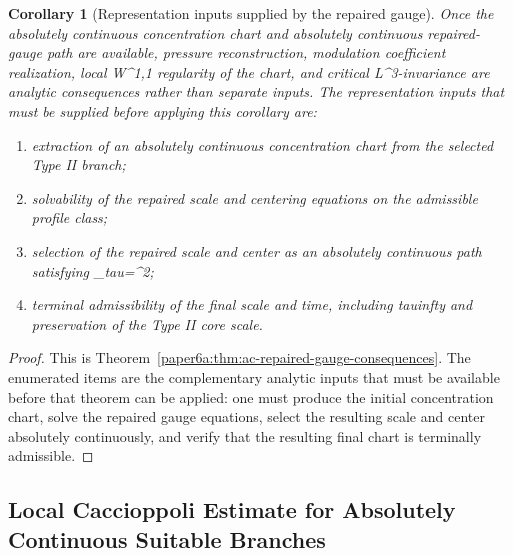 \documentclass[11pt]{amsart}
\def\({}%
\def\){}%
\def\tau{tau}%
\def\infty{infty}%
\theoremstyle{plain}
\newtheorem{corollary}[corollary]{Corollary}
\theoremstyle{definition}
\theoremstyle{remark}
\begin{document}
\begin{corollary}[Representation inputs supplied by the repaired gauge]
\label{paper6a:cor:representation-inputs-repaired-gauge}
Once the absolutely continuous concentration chart and absolutely continuous
repaired-gauge path are available, pressure reconstruction, modulation
coefficient realization, local \(W^{1,1}\) regularity of the chart, and
critical \(L^3\)-invariance are analytic consequences rather than separate
inputs.  The representation inputs that must be supplied before applying this
corollary are:
\begin{enumerate}[label=\textup{(\roman*)}]
\item extraction of an absolutely continuous concentration chart from the
selected Type II branch;
\item solvability of the repaired scale and centering equations on the
admissible profile class;
\item selection of the repaired scale and center as an absolutely continuous
path satisfying
\(\rho_\tau=\mu^2\);
\item terminal admissibility of the final scale and time, including
\(\tau\to\infty\) and preservation of the Type II core scale.
\end{enumerate}
\end{corollary}

\begin{proof}
This is Theorem~\ref{paper6a:thm:ac-repaired-gauge-consequences}.  The
enumerated items are the complementary analytic inputs that must be
available before that theorem can be applied: one must produce the initial concentration chart,
solve the repaired gauge equations, select the resulting scale and center
absolutely continuously,
and verify that the resulting final chart is terminally admissible.
\end{proof}

\subsection{Local Caccioppoli Estimate for Absolutely Continuous Suitable Branches}
\label{subsec:ac-suitable-local-caccioppoli}
\end{document}
